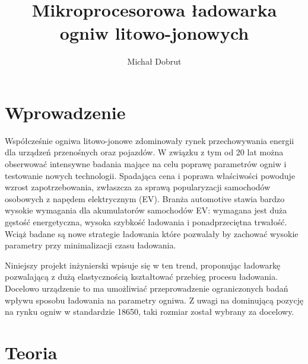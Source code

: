 \documentclass[polish,engineer]{polsl-msth}
\author{Michał Dobrut}
\title{Mikroprocesorowa ładowarka ogniw litowo-jonowych}
\begin{document}
\frontmatter
\maketitle
\makestatement
\tableofcontents
\listoftables
\listoffigures
\mainmatter

\chapter{Wprowadzenie}

Współcześnie ogniwa litowo-jonowe zdominowały rynek przechowywania energii dla urządzeń przenośnych oraz pojazdów. W związku z tym od 20 lat można obserwować intensywne badania mające na celu poprawę parametrów ogniw i testowanie nowych technologii. Spadająca cena i poprawa właściwości powoduje wzrost zapotrzebowania, zwłaszcza za sprawą popularyzacji samochodów osobowych z napędem elektrycznym (EV). Branża automotive stawia bardzo wysokie wymagania dla akumulatorów samochodów EV: wymagana jest duża gęstość energetyczna, wysoka szybkość ładowania i ponadprzeciętna trwałość. Wciąż badane są nowe strategie ładowania które pozwalały by zachować wysokie parametry przy minimalizacji czasu ładowania.

Niniejszy projekt inżynierski wpisuje się w ten trend, proponując ładowarkę pozwalającą z dużą elastycznością kształtować przebieg procesu ładowania. Docelowo urządzenie to ma umożliwiać przeprowadzenie ograniczonych badań wpływu sposobu ładowania na parametry ogniwa. Z uwagi na dominującą pozycję na rynku ogniw w standardzie 18650, taki rozmiar został wybrany za docelowy. 

\chapter{Teoria}
\end{document}
